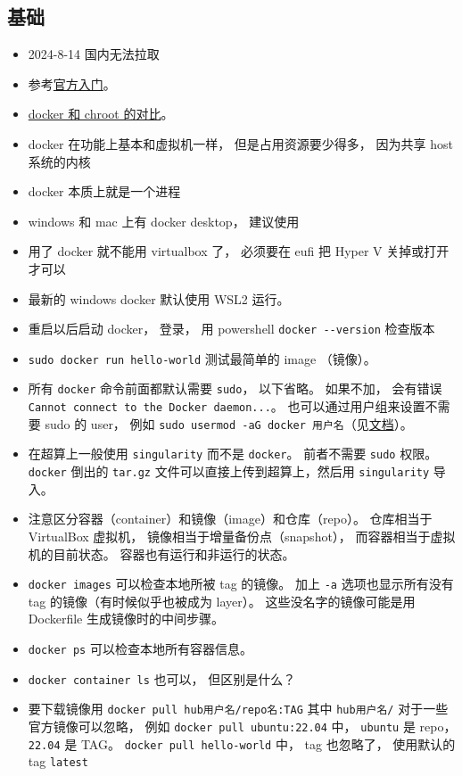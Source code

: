 \subsection{基础}
\begin{itemize}
\item 2024-8-14 国内无法拉取
\item 参考\href{https://docs.docker.com/get-started/}{官方入门}。
\item \href{https://devops.stackexchange.com/questions/2826/difference-between-chroot-and-docker}{docker 和 chroot 的对比}。
\item docker 在功能上基本和虚拟机一样， 但是占用资源要少得多， 因为共享 host 系统的内核
\item docker 本质上就是一个进程
\item windows 和 mac 上有 docker desktop， 建议使用
\item 用了 docker 就不能用 virtualbox 了， 必须要在 eufi 把 Hyper V 关掉或打开才可以
\item 最新的 windows docker 默认使用 WSL2 运行。
\item 重启以后启动 docker， 登录， 用 powershell \verb`docker --version` 检查版本
\item \verb`sudo docker run hello-world` 测试最简单的 image （镜像）。
\item 所有 \verb`docker` 命令前面都默认需要 \verb`sudo`， 以下省略。 如果不加， 会有错误 \verb`Cannot connect to the Docker daemon...`。 也可以通过用户组来设置不需要 sudo 的 user， 例如 \verb`sudo usermod -aG docker 用户名`（见\href{https://docs.docker.com/engine/install/linux-postinstall/}{文档}）。
\item 在超算上一般使用 \verb`singularity` 而不是 \verb`docker`。 前者不需要 \verb`sudo` 权限。 \verb`docker` 倒出的 \verb`tar.gz` 文件可以直接上传到超算上，然后用 \verb`singularity` 导入。
\item 注意区分容器（container）和镜像（image）和仓库（repo）。 仓库相当于 VirtualBox 虚拟机， 镜像相当于增量备份点（snapshot）， 而容器相当于虚拟机的目前状态。 容器也有运行和非运行的状态。
\item \verb`docker images` 可以检查本地所被 tag 的镜像。 加上 \verb`-a` 选项也显示所有没有 tag 的镜像（有时候似乎也被成为 layer）。 这些没名字的镜像可能是用 Dockerfile 生成镜像时的中间步骤。
\item \verb`docker ps` 可以检查本地所有容器信息。
\item \verb`docker container ls` 也可以， 但区别是什么？
\item 要下载镜像用 \verb`docker pull hub用户名/repo名:TAG` 其中 \verb`hub用户名/` 对于一些官方镜像可以忽略， 例如 \verb`docker pull ubuntu:22.04` 中， \verb`ubuntu` 是 repo， \verb`22.04` 是 TAG。 \verb`docker pull hello-world` 中， tag 也忽略了， 使用默认的 tag \verb`latest`

\end{itemize}

